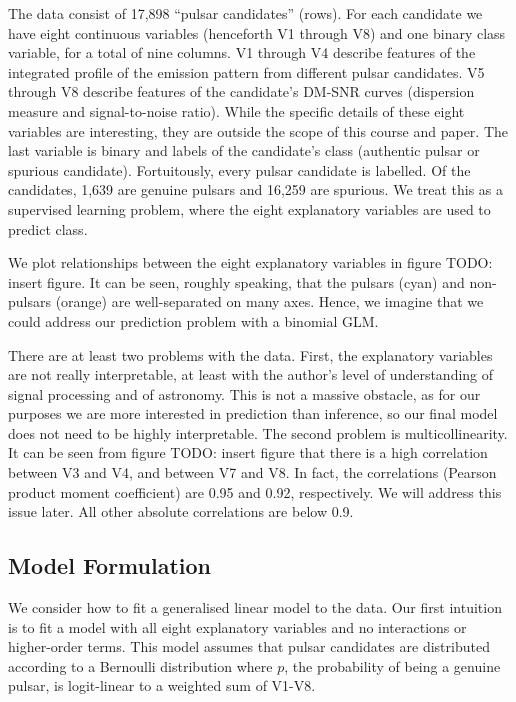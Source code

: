\documentclass[11pt, oneside]{article}
\begin{document}
The data consist of 17,898 ``pulsar candidates'' (rows). For each candidate we have eight continuous variables (henceforth V1 through V8) and one binary class variable, for a total of nine columns. V1 through V4 describe features of the integrated profile of the emission pattern from different pulsar candidates. V5 through V8 describe features of the candidate's DM-SNR curves (dispersion measure and signal-to-noise ratio). \cite{data} While the specific details of these eight variables are interesting, they are outside the scope of this course and paper. The last variable is binary and labels of the candidate's class (authentic pulsar or spurious candidate). Fortuitously, every pulsar candidate is labelled. Of the candidates, 1,639 are genuine pulsars and 16,259 are spurious. We treat this as a supervised learning problem, where the eight explanatory variables are used to predict class. 

We plot relationships between the eight explanatory variables in figure {\color{red} TODO: insert figure}. It can be seen, roughly speaking, that the pulsars (cyan) and non-pulsars (orange) are well-separated on many axes. Hence, we imagine that we could address our prediction problem with a binomial GLM. 

There are at least two problems with the data. First, the explanatory variables are not really interpretable, at least with the author's level of understanding of signal processing and of astronomy. This is not a massive obstacle, as for our purposes we are more interested in prediction than inference, so our final model does not need to be highly interpretable. The second problem is multicollinearity. It can be seen from figure {\color{red} TODO: insert figure} that there is a high correlation between V3 and V4, and between V7 and V8. In fact, the correlations (Pearson product moment coefficient) are 0.95 and 0.92, respectively. We will address this issue later. All other absolute correlations are below 0.9. 

\subsection{Model Formulation}

We consider how to fit a generalised linear model to the data. Our first intuition is to fit a model with all eight explanatory variables and no interactions or higher-order terms. This model assumes that pulsar candidates are distributed according to a Bernoulli distribution where $p$, the probability of being a genuine pulsar, is logit-linear to a weighted sum of V1-V8. 
\end{document}

